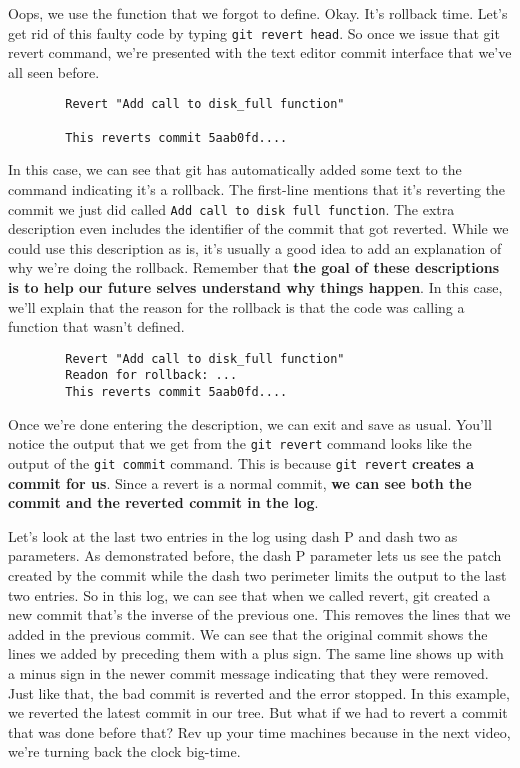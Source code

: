 	Oops, we use the function that we forgot to define. Okay. It's rollback time. Let's get rid of this faulty code by typing \texttt{git revert head}. 
	So once we issue that git revert command, we're presented with the text editor commit interface that we've all seen before. 
	
	\begin{verbatim}
		Revert "Add call to disk_full function"
		
		This reverts commit 5aab0fd....
	\end{verbatim}
	
	In this case, we can see that git has automatically added some text to the command indicating it's a rollback. The first-line mentions that it's reverting the commit we just did called \texttt{Add call to disk full function}. The extra description even includes the identifier of the commit that got reverted. While we could use this description as is, it's usually a good idea to add an explanation of why we're doing the rollback. Remember that\textbf{ the goal of these descriptions is to help our future selves understand why things happen}. In this case, we'll explain that the reason for the rollback is that the code was calling a function that wasn't defined.
	
	\begin{verbatim}
		Revert "Add call to disk_full function"
		Readon for rollback: ...
		This reverts commit 5aab0fd....
	\end{verbatim}

	Once we're done entering the description, we can exit and save as usual. You'll notice the output that we get from the \texttt{git revert} command looks like the output of the \texttt{git commit} command. This is because \texttt{git revert}\textbf{ creates a commit for us}. Since a revert is a normal commit,\textbf{ we can see both the commit and the reverted commit in the log}. 
	
	Let's look at the last two entries in the log using dash P and dash two as parameters. As demonstrated before, the dash P parameter lets us see the patch created by the commit while the dash two perimeter limits the output to the last two entries. So in this log, we can see that when we called revert, git created a new commit that's the inverse of the previous one. This removes the lines that we added in the previous commit. We can see that the original commit shows the lines we added by preceding them with a plus sign. The same line shows up with a minus sign in the newer commit message indicating that they were removed. Just like that, the bad commit is reverted and the error stopped. In this example, we reverted the latest commit in our tree. But what if we had to revert a commit that was done before that? Rev up your time machines because in the next video, we're turning back the clock big-time.
	
